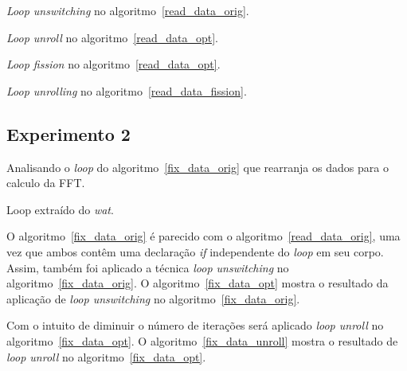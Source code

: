 \begin{algorithm}[H]
  \caption{\textit{Loop unswitching} no algoritmo~\ref{read_data_orig}.}
    \label{read_data_opt}

\end{algorithm}

\begin{algorithm}[H]
  \caption{\textit{Loop unroll} no algoritmo~\ref{read_data_opt}.}
    \label{read_data_unroll}

\end{algorithm}

\begin{algorithm}[H]
  \caption{\textit{Loop fission} no algoritmo~\ref{read_data_opt}.}
    \label{read_data_fission}

\end{algorithm}

\begin{algorithm}[H]
  \caption{\textit{Loop unrolling} no algoritmo~\ref{read_data_fission}.}
    \label{read_data_unrofis}

\end{algorithm}

\subsection{Experimento 2}

Analisando o \textit{loop} do algoritmo~\ref{fix_data_orig} que rearranja os dados
para o calculo da FFT. 

\begin{algorithm}[H]
  \caption{Loop extraído do \textit{wat}.}
    \label{fix_data_orig}

\end{algorithm}

O algoritmo~\ref{fix_data_orig} é parecido com o algoritmo~\ref{read_data_orig}, uma
vez que ambos contêm uma declaração \textit{if} independente do \textit{loop} em seu corpo. 
Assim, também foi aplicado a técnica \textit{loop unswitching} no
algoritmo~\ref{fix_data_orig}.
O algoritmo~\ref{fix_data_opt} mostra o resultado da aplicação de \textit{loop
unswitching} no algoritmo~\ref{fix_data_orig}.

Com o intuito de diminuir o número de iterações será aplicado \textit{loop
unroll} no algoritmo~\ref{fix_data_opt}. 
O algoritmo~\ref{fix_data_unroll} mostra o resultado de \textit{loop unroll} no
algoritmo~\ref{fix_data_opt}.


